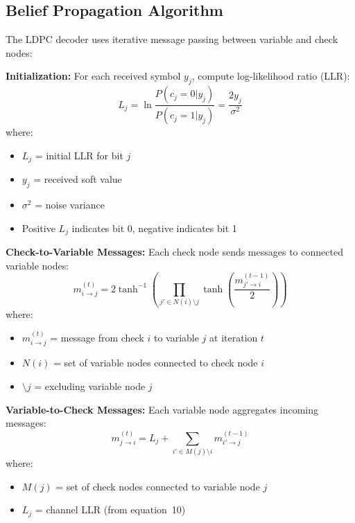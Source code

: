 \subsection{Belief Propagation Algorithm}

The LDPC decoder uses iterative message passing between variable and check nodes:

\textbf{Initialization:} For each received symbol $y_j$, compute log-likelihood ratio (LLR):
\begin{equation}
L_j = \ln\frac{P(c_j = 0 | y_j)}{P(c_j = 1 | y_j)} = \frac{2y_j}{\sigma^2}
\end{equation}
where:
\begin{itemize}
\item $L_j$ = initial LLR for bit $j$
\item $y_j$ = received soft value
\item $\sigma^2$ = noise variance
\item Positive $L_j$ indicates bit 0, negative indicates bit 1
\end{itemize}

\textbf{Check-to-Variable Messages:} Each check node sends messages to connected variable nodes:
\begin{equation}
m_{i \rightarrow j}^{(t)} = 2 \tanh^{-1}\left(\prod_{j' \in N(i) \setminus j} \tanh\left(\frac{m_{j' \rightarrow i}^{(t-1)}}{2}\right)\right)
\end{equation}
where:
\begin{itemize}
\item $m_{i \rightarrow j}^{(t)}$ = message from check $i$ to variable $j$ at iteration $t$
\item $N(i)$ = set of variable nodes connected to check node $i$
\item $\setminus j$ = excluding variable node $j$
\end{itemize}

\textbf{Variable-to-Check Messages:} Each variable node aggregates incoming messages:
\begin{equation}
m_{j \rightarrow i}^{(t)} = L_j + \sum_{i' \in M(j) \setminus i} m_{i' \rightarrow j}^{(t-1)}
\end{equation}
where:
\begin{itemize}
\item $M(j)$ = set of check nodes connected to variable node $j$
\item $L_j$ = channel LLR (from equation~10)
\end{itemize}

